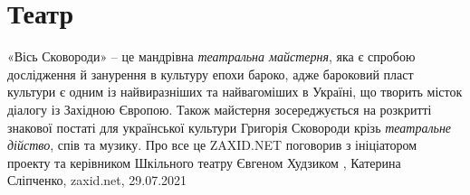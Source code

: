  
 
 
 
 
\chapter{Театр}

«Вісь Сковороди» – це мандрівна \emph{театральна майстерня}, яка є спробою дослідження
й занурення в культуру епохи бароко, адже бароковий пласт культури є одним із
найвиразніших та найвагоміших в Україні, що творить місток діалогу із Західною
Європою. Також майстерня зосереджується на розкритті знакової постаті для
української культури Григорія Сковороди крізь \emph{театральне дійство}, спів та
музику.  Про все це ZAXID.NET поговорив з ініціатором проекту та керівником
Шкільного театру Євгеном Худзиком
, 
Катерина Сліпченко, zaxid.net, 29.07.2021
